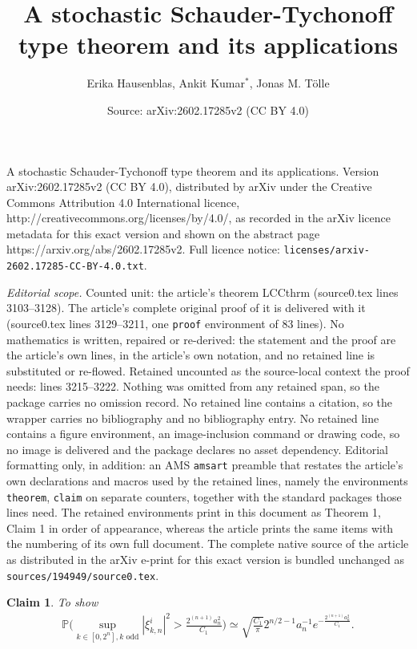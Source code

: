 \documentclass[10pt,a4paper]{amsart}
\title{A stochastic Schauder-Tychonoff type theorem and its applications}
\author{Erika Hausenblas, Ankit Kumar$^\ast$, Jonas M. T\"{o}lle}
\date{Source: arXiv:2602.17285v2 (CC BY 4.0)}
\newtheorem{claim}{Claim}
\renewcommand{\P}{\mathbb{P}}
\renewcommand{\emph}[1]{{\sl #1}}
\begin{document}
\maketitle

\noindent\emph{Source and licence.} A stochastic Schauder-Tychonoff type theorem and its applications. Version arXiv:2602.17285v2 (CC BY 4.0), distributed by arXiv under the Creative Commons Attribution 4.0 International licence, http://creativecommons.org/licenses/by/4.0/, as recorded in the arXiv licence metadata for this exact version and shown on the abstract page https://arxiv.org/abs/2602.17285v2. Full licence notice: \texttt{licenses/arxiv-2602.17285-CC-BY-4.0.txt}.\par\smallskip

\noindent\textit{Editorial scope.} Counted unit: the article's theorem LCCthrm (source0.tex lines 3103--3128). The article's complete original proof of it is delivered with it (source0.tex lines 3129--3211, one \texttt{proof} environment of 83 lines). No mathematics is written, repaired or re-derived: the statement and the proof are the article's own lines, in the article's own notation, and no retained line is substituted or re-flowed.  Retained uncounted as the source-local context the proof needs: lines 3215--3222.  Nothing was omitted from any retained span, so the package carries no omission record.  No retained line contains a citation, so the wrapper carries no bibliography and no bibliography entry.  No retained line contains a figure environment, an image-inclusion command or drawing code, so no image is delivered and the package declares no asset dependency.  Editorial formatting only, in addition: an AMS \texttt{amsart} preamble that restates the article's own declarations and macros used by the retained lines, namely the environments \texttt{theorem}, \texttt{claim} on separate counters, together with the standard packages those lines need.  The retained environments print in this document as Theorem 1, Claim 1 in order of appearance, whereas the article prints the same items with the numbering of its own full document.  The complete native source of the article as distributed in the arXiv e-print for this exact version is bundled unchanged as \texttt{sources/194949/source0.tex}.
\begin{claim}\label{claim6.3}
	To show
	\begin{align*}
		\P\bigg(\sup_{k\in[0,2^n],k\text{ odd}}|\xi_{k,n}^i|^2> \frac{2^{(n+1)}a_n^2}{C_1}\bigg)
		\simeq
		\sqrt{\frac{C_1}{\pi} }2^{n/2-1}a_n^{-1}e^{-\frac{2^{(n+1)}a_n^2}{C_1}}.
	\end{align*}
\end{claim}
\end{document}

